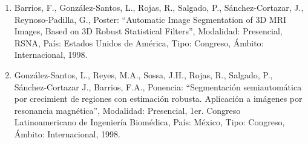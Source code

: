 \begin{enumerate}
\item Barrios, F., González-Santos, L., Rojas, R., Salgado, P., Sánchez-Cortazar, J., Reynoso-Padilla, G., 
Poster: 
“Automatic Image Segmentation of 3D MRI Images, Based on 3D Robust Statistical Filters”, Modalidad: 
Presencial, RSNA, País: Estados Unidos de América, Tipo: Congreso, Ámbito: Internacional, 1998.

\item González-Santos, L., Reyes, M.A., Sossa, J.H., Rojas, R., Salgado, P., Sánchez-Cortazar J., Barrios, 
F.A., 
Ponencia: “Segmentación semiautomática por crecimient de regiones con estimación robusta. Aplicación a 
imágenes por resonancia magnética”, Modalidad: Presencial, 1er. Congreso Latinoamericano de Ingeniería 
Biomédica, País: México, Tipo: Congreso, Ámbito: Internacional, 1998.

\end{enumerate}

